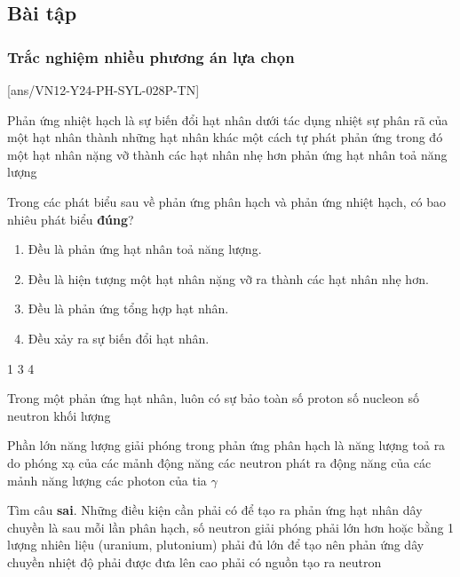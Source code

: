 \subsection{Bài tập}
\subsubsection{Trắc nghiệm nhiều phương án lựa chọn}
\setcounter{ex}{0}
[ans/VN12-Y24-PH-SYL-028P-TN]
\begin{ex}
	Phản ứng nhiệt hạch là
	\choice
	{sự biến đổi hạt nhân dưới tác dụng nhiệt}
	{sự phân rã của một hạt nhân thành những hạt nhân khác một cách tự phát}
	{phản ứng trong đó một hạt nhân nặng vỡ thành các hạt nhân nhẹ hơn}
	{\True phản ứng hạt nhân toả năng lượng}
	\loigiai{}
\end{ex}
\begin{ex}
	Trong các phát biểu sau về phản ứng phân hạch và phản ứng nhiệt hạch, có bao nhiêu phát biểu \textbf{đúng}?	
	\begin{enumerate}[label=(\arabic*)]
		\item Đều là phản ứng hạt nhân toả năng lượng.
		\item Đều là hiện tượng một hạt nhân nặng vỡ ra thành các hạt nhân nhẹ hơn.
		\item Đều là phản ứng tổng hợp hạt nhân.
		\item Đều xảy ra sự biến đổi hạt nhân.
	\end{enumerate}
	\choice
	{1}
	{}
	{3}
	{4}
\end{ex}
\begin{ex}
	Trong một phản ứng hạt nhân, luôn có sự bảo toàn
	\choice
	{số proton}
	{\True số nucleon}
	{số neutron}
	{khối lượng}
	\loigiai{}
\end{ex}
\begin{ex}
	Phần lớn năng lượng giải phóng trong phản ứng phân hạch là
	\choice
	{năng lượng toả ra do phóng xạ của các mảnh}
	{động năng các neutron phát ra}
	{\True động năng của các mảnh}
	{năng lượng các photon của tia $\gamma$}
	\loigiai{}
\end{ex}
\begin{ex}
	Tìm câu \textbf{sai}. Những điều kiện cần phải có để tạo ra phản ứng hạt nhân dây chuyền là
	\choice
	{sau mỗi lần phân hạch, số neutron giải phóng phải lớn hơn hoặc bằng 1}
	{lượng nhiên liệu (uranium, plutonium) phải đủ lớn để tạo nên phản ứng dây chuyền}
	{\True nhiệt độ phải được đưa lên cao}
	{phải có nguồn tạo ra neutron}
	\loigiai{}
\end{ex}

